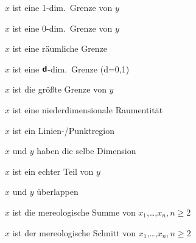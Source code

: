     \begin{enumAx}[D]      
        
                {$x$ ist eine 1-dim.\ Grenze von $y$}
                
                {$x$ ist eine 0-dim.\ Grenze von $y$}             
                
                {$x$ ist eine räumliche Grenze}
                
                {$x$ ist eine $\boldsymbol{\mathsf{d}}$-dim.\ Grenze (d=0,1)}
                
                {$x$ ist die größte Grenze von $y$}  

                {$x$ ist eine niederdimensionale Raumentität}

                {$x$ ist ein Linien-/Punktregion}
                                                                                                
            {$x$ und $y$ haben die selbe Dimension}

                {$x$ ist ein echter Teil von $y$}

        
                {$x$ und $y$ überlappen}

        
                {$x$ ist die mereologische Summe von $x_{1}$,\ldots,$x_{n}, n \ge 2$}
                
                {$x$ ist der mereologische Schnitt von $x_{1}$,\ldots,$x_{n}, n \ge 2$}
                

\end{enumAx}

